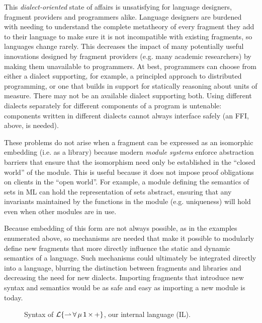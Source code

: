 \documentclass{llncs}
\begin{document}
This \emph{dialect-oriented} state of affairs is unsatisfying for language  designers, fragment providers and programmers alike. Language designers are burdened with needing to understand the complete metatheory of every fragment they add to their language to make sure it is not incompatible with existing fragments, so languages change rarely. This decreases the impact of many potentially useful innovations designed by fragment providers (e.g. many academic researchers) by making them unavailable to programmers. At best, programmers can choose from either a dialect supporting, for example, a principled approach to distributed programming, or one that builds in support for statically reasoning about units of measure. There may not be an available dialect supporting both. Using different dialects separately for different components of a program is untenable: components written in different dialects cannot always interface safely (an FFI, above, is needed). 

These problems do not arise when a fragment can be expressed as an isomorphic embedding (i.e. as a library) because modern \emph{module systems} enforce abstraction barriers that ensure that the isomorphism need only be established in the ``closed world'' of the module. This is useful because it does not impose proof obligations on clients in the ``open world''. For example, a module defining the semantics of sets in ML can hold the representation of sets abstract, ensuring that any invariants maintained by the functions in the module (e.g. uniqueness) will hold even when other modules are in use. %

Because embedding of this form are not always possible, as in the examples enumerated above, so mechanisms are needed that make it possible to modularly define new fragments that more directly influence the static and dynamic semantics of a language. Such mechanisms could ultimately be integrated directly into a language, blurring the distinction between fragments and libraries and decreasing the need for new dialects. Importing fragments that introduce new syntax and semantics   would be as safe and easy as importing a new module is today. %
\begin{figure}[t]

\caption{Syntax of {$\mathcal{L}\{{\rightharpoonup}\,{\forall}\,{\mu}\,{{\sf 1}}\,{\times}\,{+}\}$}, our internal language (IL).}
\label{syntax-IL}
\end{figure}
\end{document}

